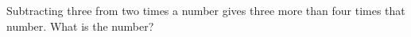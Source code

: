 Subtracting three from two times a number gives three more than four times that number. What is the number?
